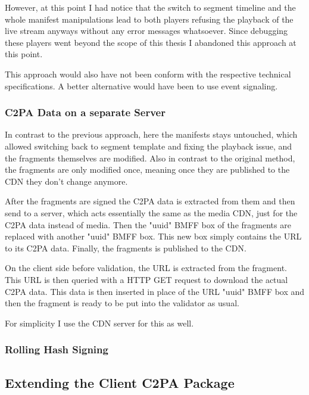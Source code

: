 However, at this point I had notice that the switch to segment timeline and the whole manifest manipulations lead to both players refusing the playback of the live stream anyways without any error messages whatsoever. Since debugging these players went beyond the scope of this thesis I abandoned this approach at this point. 

This approach would also have not been conform with the respective technical specifications. A better alternative would have been to use event signaling. 

\subsubsection{C2PA Data on a separate Server\label{sec:on_server}}

In contrast to the previous approach, here the manifests stays untouched, which allowed switching back to segment template and fixing the playback issue, and the fragments themselves are modified. Also in contrast to the original method, the fragments are only modified once, meaning once they are published to the CDN they don't change anymore.

After the fragments are signed the C2PA data is extracted from them and then send to a server, which acts essentially the same as the media CDN, just for the C2PA data instead of media. Then the "uuid" BMFF box of the fragments are replaced with another "uuid" BMFF box. This new box simply contains the URL to its C2PA data. Finally, the fragments is published to the CDN.

On the client side before validation, the URL is extracted from the fragment. This URL is then queried with a HTTP GET request to download the actual C2PA data. This data is then inserted in place of the URL "uuid" BMFF box and then the fragment is ready to be put into the validator as usual.

For simplicity I use the CDN server for this as well.

\subsubsection{Rolling Hash Signing\label{sec:rolling_hash_sign}}


\subsection{Extending the Client C2PA Package\label{sec:wasm}}

